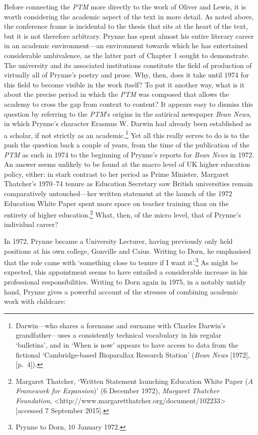 \documentclass[]{article}
\begin{document}
Before connecting the \emph{PTM} more directly to the work of Oliver and
Lewis, it is worth considering the academic aspect of the text in more
detail. As noted above, the conference frame is incidental to the thesis
that sits at the heart of the text, but it is not therefore arbitrary.
Prynne has spent almost his entire literary career in an academic
environment—an environment towards which he has entertained considerable
ambivalence, as the latter part of Chapter 1 sought to demonstrate. The
university and its associated institutions constitute the field of
production of virtually all of Prynne’s poetry and prose. Why, then,
does it take until 1974 for this field to become visible in the work
itself? To put it another way, what is it about the precise period in
which the \emph{PTM} was composed that allows the academy to cross the
gap from context to content? It appears easy to dismiss this question by
referring to the \emph{PTM}’s origins in the satirical newspaper
\emph{Bean News}, in which Prynne’s character Erasmus W. Darwin had
already been established as a scholar, if not strictly as an
academic.\footnote{Darwin—who shares a forename and surname with Charles
  Darwin’s grandfather—uses a consistently technical vocabulary in his
  regular ‘bulletins’, and in ‘When is now’ appears to have access to
  data from the fictional ‘Cambridge-based Bioparallax Research Station’
  (\emph{Bean News} {[}1972{]}, {[}p.~4{]}).} Yet all this really serves
to do is to the push the question back a couple of years, from the time
of the publication of the \emph{PTM} as such in 1974 to the beginning of
Prynne’s reports for \emph{Bean News} in 1972. An answer seems unlikely
to be found at the macro level of UK higher education policy, either: in
stark contrast to her period as Prime Minister, Margaret Thatcher’s
1970–74 tenure as Education Secretary saw British universities remain
comparatively untouched—her written statement at the launch of the 1972
Education White Paper spent more space on teacher training than on the
entirety of higher education.\footnote{Margaret Thatcher, ‘Written
  Statement launching Education White Paper (\emph{A Framework for
  Expansion})’ (6 December 1972), \emph{Margaret Thatcher Foundation},
  \textless{}http://www.margaretthatcher.org/document/102233\textgreater{}
  {[}accessed 7 September 2015{]}.} What, then, of the micro level, that
of Prynne’s individual career?

In 1972, Prynne became a University Lecturer, having previously only
held positions at his own college, Gonville and Caius. Writing to Dorn,
he emphasised that the role came with ‘something close to tenure if I
want it’.\footnote{Prynne to Dorn, 10 January 1972.} As might be
expected, this appointment seems to have entailed a considerable
increase in his professional responsibilities. Writing to Dorn again in
1975, in a notably untidy hand, Prynne gives a powerful account of the
stresses of combining academic work with childcare:
\end{document}
